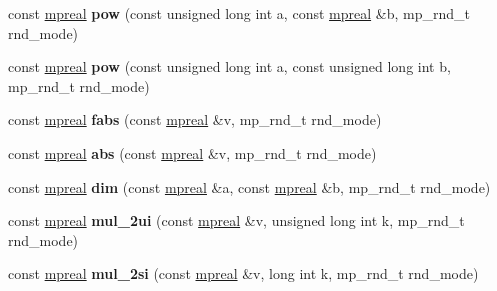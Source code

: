 \begin{DoxyCompactItemize}
\item 
\mbox{\label{classmpfr_1_1mpreal_ab307ff53337bdf1ba9ad90f3cbc7034c}} 
const \hyperlink{classmpfr_1_1mpreal}{mpreal} {\bfseries pow} (const unsigned long int a, const \hyperlink{classmpfr_1_1mpreal}{mpreal} \&b, mp\+\_\+rnd\+\_\+t rnd\+\_\+mode)
\item 
\mbox{\label{classmpfr_1_1mpreal_adbe2050d3b632bbbbc2fedecea82e038}} 
const \hyperlink{classmpfr_1_1mpreal}{mpreal} {\bfseries pow} (const unsigned long int a, const unsigned long int b, mp\+\_\+rnd\+\_\+t rnd\+\_\+mode)
\item 
\mbox{\label{classmpfr_1_1mpreal_a15f52ba5582f9fbae7a15ff1f53c5af8}} 
const \hyperlink{classmpfr_1_1mpreal}{mpreal} {\bfseries fabs} (const \hyperlink{classmpfr_1_1mpreal}{mpreal} \&v, mp\+\_\+rnd\+\_\+t rnd\+\_\+mode)
\item 
\mbox{\label{classmpfr_1_1mpreal_aa4f1f7be7933232e833fbe9a86ba74a3}} 
const \hyperlink{classmpfr_1_1mpreal}{mpreal} {\bfseries abs} (const \hyperlink{classmpfr_1_1mpreal}{mpreal} \&v, mp\+\_\+rnd\+\_\+t rnd\+\_\+mode)
\item 
\mbox{\label{classmpfr_1_1mpreal_a5bbe70209401df6af53abb48b0929bf4}} 
const \hyperlink{classmpfr_1_1mpreal}{mpreal} {\bfseries dim} (const \hyperlink{classmpfr_1_1mpreal}{mpreal} \&a, const \hyperlink{classmpfr_1_1mpreal}{mpreal} \&b, mp\+\_\+rnd\+\_\+t rnd\+\_\+mode)
\item 
\mbox{\label{classmpfr_1_1mpreal_a70f39512ad54db1a5ea710fa65d0aaeb}} 
const \hyperlink{classmpfr_1_1mpreal}{mpreal} {\bfseries mul\+\_\+2ui} (const \hyperlink{classmpfr_1_1mpreal}{mpreal} \&v, unsigned long int k, mp\+\_\+rnd\+\_\+t rnd\+\_\+mode)
\item 
\mbox{\label{classmpfr_1_1mpreal_a078571e7f5f07d7635eb81cb6d57c7a5}} 
const \hyperlink{classmpfr_1_1mpreal}{mpreal} {\bfseries mul\+\_\+2si} (const \hyperlink{classmpfr_1_1mpreal}{mpreal} \&v, long int k, mp\+\_\+rnd\+\_\+t rnd\+\_\+mode)
\item 
\mbox{\label{classmpfr_1_1mpreal_ab104903d3f12e40a2253675d67c9ed4d}} 

\end{DoxyCompactItemize}
